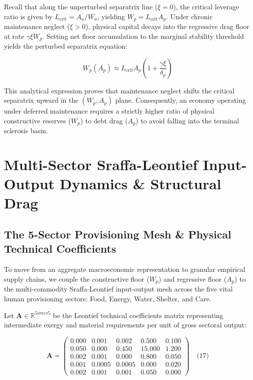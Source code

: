 \documentclass[preprint,12pt,authoryear]{elsarticle}
\theoremstyle{definition}
\begin{document}
Recall that along the unperturbed separatrix line ($\xi = 0$), the critical leverage ratio is given by $L_{\text{crit}} = A_a / W_a$, yielding $W_p = L_{\text{crit}} A_p$. Under chronic maintenance neglect ($\xi > 0$), physical capital decays into the regressive drag floor at rate $\gamma \xi W_p$. Setting net floor accumulation to the marginal stability threshold yields the perturbed separatrix equation:

$$W_p(A_p) \approx L_{\text{crit}} A_p \left(1 + \frac{\gamma \xi}{\delta_p} \right)$$

This analytical expression proves that maintenance neglect shifts the critical separatrix upward in the $(W_p, A_p)$ plane. Consequently, an economy operating under deferred maintenance requires a strictly higher ratio of physical constructive reserves ($W_p$) to debt drag ($A_p$) to avoid falling into the terminal sclerosis basin.

\section{Multi-Sector Sraffa-Leontief Input-Output Dynamics \& Structural Drag}

\subsection{The 5-Sector Provisioning Mesh \& Physical Technical Coefficients}



To move from an aggregate macroeconomic representation to granular empirical supply chains, we couple the constructive floor ($W_p$) and regressive floor ($A_p$) to the multi-commodity Sraffa-Leontief input-output mesh across the five vital human provisioning sectors: Food, Energy, Water, Shelter, and Care.

Let $\mathbf{A} \in \mathbb{R}^{5 imes 5}$ be the Leontief technical coefficients matrix representing intermediate exergy and material requirements per unit of gross sectoral output:

$$\mathbf{A} =  \begin{pmatrix} 0.000 & 0.001 & 0.002 & 0.500 & 0.100 \\ 0.050 & 0.000 & 0.450 & 15.000 & 1.200 \\ 0.002 & 0.001 & 0.000 & 0.800 & 0.050 \\ 0.001 & 0.0005 & 0.0005 & 0.000 & 0.020 \\ 0.002 & 0.001 & 0.001 & 0.050 & 0.000 \end{pmatrix} \quad \text{(17)}$$
\end{document}
